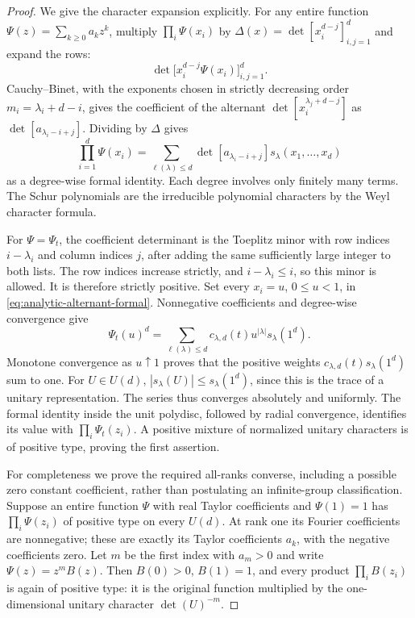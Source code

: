 \begin{proof}
We give the character expansion explicitly. For any entire
function $\Psi(z)=\sum_{k\ge0}a_kz^k$, multiply
$\prod_i\Psi(x_i)$ by
$\Delta(x)=\det[x_i^{d-j}]_{i,j=1}^d$ and expand the rows:
\[
 \det\bigl[x_i^{d-j}\Psi(x_i)\bigr]_{i,j=1}^d.
\]
Cauchy--Binet, with the exponents chosen in strictly decreasing
order $m_i=\lambda_i+d-i$, gives the coefficient of the alternant
$\det[x_i^{\lambda_j+d-j}]$ as
$\det[a_{\lambda_i-i+j}]$. Dividing by $\Delta$ gives
\begin{equation}\label{eq:analytic-alternant-formal}
 \prod_{i=1}^d\Psi(x_i)
     =\sum_{\ell(\lambda)\le d}
        \det[a_{\lambda_i-i+j}]s_\lambda(x_1,\ldots,x_d)
\end{equation}
as a degree-wise formal identity. Each degree involves only
finitely many terms. The Schur polynomials are the irreducible
polynomial characters by the Weyl character formula.

For $\Psi=\Psi_t$, the coefficient determinant is the Toeplitz
minor with row indices $i-\lambda_i$ and column indices $j$,
after adding the same sufficiently large integer to both lists.
The row indices increase strictly, and
$i-\lambda_i\le i$, so this minor is allowed. It is therefore
strictly positive. Set every $x_i=u$, $0\le u<1$, in
\eqref{eq:analytic-alternant-formal}. Nonnegative coefficients
and degree-wise convergence give
\[
 \Psi_t(u)^d
      =\sum_{\ell(\lambda)\le d}
        c_{\lambda,d}(t)u^{|\lambda|}s_\lambda(1^d).
\]
Monotone convergence as $u\uparrow1$ proves that the positive
weights $c_{\lambda,d}(t)s_\lambda(1^d)$ sum to one.
For $U\in U(d)$,
$|s_\lambda(U)|\le s_\lambda(1^d)$, since this is the trace of
a unitary representation. The series thus converges absolutely
and uniformly. The formal identity inside the unit polydisc,
followed by radial convergence, identifies its value with
$\prod_i\Psi_t(z_i)$. A positive mixture of normalized unitary
characters is of positive type, proving the first assertion.

For completeness we prove the required all-ranks converse,
including a possible zero constant coefficient, rather than
postulating an infinite-group classification. Suppose an entire
function $\Psi$ with real Taylor coefficients and $\Psi(1)=1$
has $\prod_i\Psi(z_i)$ of positive type on every $U(d)$.
At rank one its Fourier coefficients are nonnegative; these
are exactly its Taylor coefficients $a_k$, with the negative
coefficients zero. Let $m$ be the first index with $a_m>0$ and
write $\Psi(z)=z^m B(z)$. Then $B(0)>0$, $B(1)=1$, and
every product $\prod_i B(z_i)$ is again of positive type:
it is the original function multiplied by the one-dimensional
unitary character $\det(U)^{-m}$.


\end{proof}
